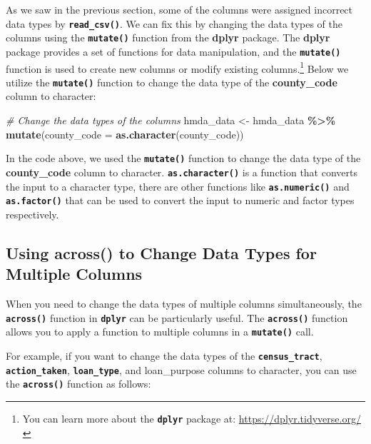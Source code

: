 \documentclass[
]{book}
\newenvironment{Shaded}{\begin{snugshade}}{\end{snugshade}}
\newcommand{\AttributeTok}[1]{\textcolor[rgb]{0.13,0.29,0.53}{#1}}
\newcommand{\CommentTok}[1]{\textcolor[rgb]{0.56,0.35,0.01}{\textit{#1}}}
\newcommand{\FunctionTok}[1]{\textcolor[rgb]{0.13,0.29,0.53}{\textbf{#1}}}
\newcommand{\NormalTok}[1]{#1}
\newcommand{\OtherTok}[1]{\textcolor[rgb]{0.56,0.35,0.01}{#1}}
\newcommand{\SpecialCharTok}[1]{\textcolor[rgb]{0.81,0.36,0.00}{\textbf{#1}}}
\begin{document}
As we saw in the previous section, some of the columns were assigned incorrect data types by \textbf{\texttt{read\_csv()}}. We can fix this by changing the data types of the columns using the \textbf{\texttt{mutate()}} function from the \textbf{dplyr} package. The \textbf{dplyr} package provides a set of functions for data manipulation, and the \textbf{\texttt{mutate()}} function is used to create new columns or modify existing columns.\footnote{You can learn more about the \textbf{\texttt{dplyr}} package at: \url{https://dplyr.tidyverse.org/}} Below we utilize the \textbf{\texttt{mutate()}} function to change the data type of the \textbf{county\_code} column to character:

\begin{Shaded}
\begin{Highlighting}[]
\CommentTok{\# Change the data types of the columns}
\NormalTok{hmda\_data }\OtherTok{\textless{}{-}}\NormalTok{ hmda\_data }\SpecialCharTok{\%\textgreater{}\%}
  \FunctionTok{mutate}\NormalTok{(}\AttributeTok{county\_code =} \FunctionTok{as.character}\NormalTok{(county\_code))}
\end{Highlighting}
\end{Shaded}

In the code above, we used the \textbf{\texttt{mutate()}} function to change the data type of the \textbf{county\_code} column to character. \textbf{\texttt{as.character()}} is a function that converts the input to a character type, there are other functions like \textbf{\texttt{as.numeric()}} and \textbf{\texttt{as.factor()}} that can be used to convert the input to numeric and factor types respectively.

\hypertarget{using-across-to-change-data-types-for-multiple-columns}{%
\subsection{Using across() to Change Data Types for Multiple Columns}\label{using-across-to-change-data-types-for-multiple-columns}}

When you need to change the data types of multiple columns simultaneously, the \textbf{\texttt{across()}} function in \textbf{\texttt{dplyr}} can be particularly useful. The \textbf{\texttt{across()}} function allows you to apply a function to multiple columns in a \textbf{\texttt{mutate()}} call.

For example, if you want to change the data types of the \textbf{\texttt{census\_tract}}, \textbf{\texttt{action\_taken}}, \textbf{\texttt{loan\_type}}, and loan\_purpose columns to character, you can use the \textbf{\texttt{across()}} function as follows:
\end{document}
